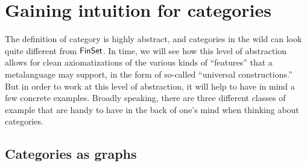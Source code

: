 

\section{Gaining intuition for categories}

The definition of category is highly abstract, and categories in the wild can look quite different from \(\mathsf{FinSet}\).
In time, we will see how this level of abstraction allows for
clean axiomatizations of the various kinds of ``features'' that a metalanguage may support,
in the form of so-called ``universal constructions.''
But in order to work at this level of abstraction,
it will help to have in mind a few concrete examples.
Broadly speaking, there are three different classes of example
that are handy to have in the back of one's mind when thinking about categories.

\subsection{Categories as graphs}

